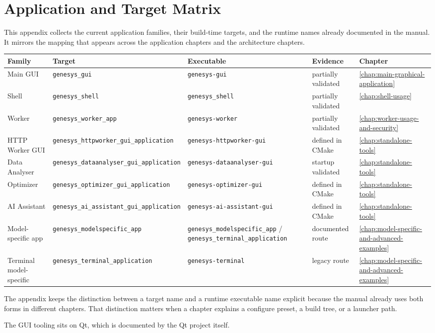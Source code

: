 \chapter{Application and Target Matrix}
\label{chap:appendix-application-and-target-matrix}

This appendix collects the current application families, their build-time
targets, and the runtime names already documented in the manual. It mirrors
the mapping that appears across the application chapters and the architecture
chapters. 

\begin{table}[htbp]
\centering
\small
\begin{tabular}{|p{3.2cm}|p{3.4cm}|p{2.8cm}|p{2.0cm}|p{2.5cm}|}
\hline
\textbf{Family} & \textbf{Target} & \textbf{Executable} & \textbf{Evidence} & \textbf{Chapter} \\
\hline
Main GUI & \texttt{genesys\_gui} & \texttt{genesys-gui} & partially validated & \ref{chap:main-graphical-application} \\
\hline
Shell & \texttt{genesys\_shell} & \texttt{genesys\_shell} & partially validated & \ref{chap:shell-usage} \\
\hline
Worker & \texttt{genesys\_worker\_app} & \texttt{genesys-worker} & partially validated & \ref{chap:worker-usage-and-security} \\
\hline
HTTP Worker GUI & \texttt{genesys\_httpworker\_gui\_application} & \texttt{genesys-httpworker-gui} & defined in CMake & \ref{chap:standalone-tools} \\
\hline
Data Analyser & \texttt{genesys\_dataanalyser\_gui\_application} & \texttt{genesys-dataanalyser-gui} & startup validated & \ref{chap:standalone-tools} \\
\hline
Optimizer & \texttt{genesys\_optimizer\_gui\_application} & \texttt{genesys-optimizer-gui} & defined in CMake & \ref{chap:standalone-tools} \\
\hline
AI Assistant & \texttt{genesys\_ai\_assistant\_gui\_application} & \texttt{genesys-ai-assistant-gui} & defined in CMake & \ref{chap:standalone-tools} \\
\hline
Model-specific app & \texttt{genesys\_modelspecific\_app} & \texttt{genesys\_modelspecific\_app} / \texttt{genesys\_terminal\_application} & documented route & \ref{chap:model-specific-and-advanced-examples} \\
\hline
Terminal model-specific & \texttt{genesys\_terminal\_application} & \texttt{genesys-terminal} & legacy route & \ref{chap:model-specific-and-advanced-examples} \\
\hline
\end{tabular}
\end{table}

The appendix keeps the distinction between a target name and a runtime
executable name explicit because the manual already uses both forms in
different chapters. That distinction matters when a chapter explains a
configure preset, a build tree, or a launcher path.

The GUI tooling sits on Qt, which is documented by the Qt project itself.
\cite{qt-docs}
